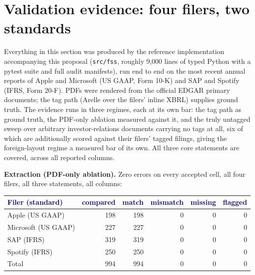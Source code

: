 \documentclass[11pt]{article}
\newcommand{\lead}[2]{\par\addvspace{5pt}\textbf{\textcolor{#1}{#2}}}
\newcommand{\headtext}[1]{\textcolor{navy}{\textbf{#1}}}
\begin{document}
\section{Validation evidence: four filers, two standards}
\label{sec:evidence}
Everything in this section was produced by the reference implementation accompanying this proposal (\texttt{src/fss}, roughly 9{,}000 lines of typed Python with a pytest suite and full audit manifests), run end to end on the most recent annual reports of Apple and Microsoft (US GAAP, Form 10-K) and SAP and Spotify (IFRS, Form 20-F). PDFs were rendered from the official EDGAR primary documents; the tag path (Arelle over the filers' inline XBRL) supplies ground truth. The evidence runs in three regimes, each at its own bar: the tag path as ground truth, the PDF-only ablation measured against it, and the truly untagged sweep over arbitrary investor-relations documents carrying no tags at all, six of which are additionally scored against their filers' tagged filings, giving the foreign-layout regime a measured bar of its own. All three core statements are covered, across all reported columns.

\lead{navytwo}{Extraction (PDF-only ablation).} Zero errors on every accepted cell, all four filers, all three statements, all columns:

\noindent\begin{minipage}{\linewidth}
\renewcommand{\arraystretch}{1.1}
\begin{tabularx}{\linewidth}{X rrrrr}
\hline
\rowcolor{tblhead} \headtext{Filer (standard)} & \headtext{compared} & \headtext{match} & \headtext{mismatch} & \headtext{missing} & \headtext{flagged} \\ \hline
Apple (US GAAP) & 198 & 198 & 0 & 0 & 0 \\ \hline
Microsoft (US GAAP) & 227 & 227 & 0 & 0 & 0 \\ \hline
SAP (IFRS) & 319 & 319 & 0 & 0 & 0 \\ \hline
Spotify (IFRS) & 250 & 250 & 0 & 0 & 0 \\ \hline
\rowcolor{tblhead} Total & 994 & 994 & 0 & 0 & 0 \\ \hline
\end{tabularx}
\end{minipage}
\end{document}
